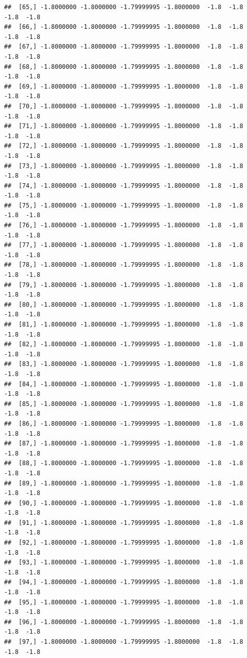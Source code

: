 \documentclass{article}\usepackage[]{graphicx}\usepackage[]{color}
\makeatletter
\newenvironment{kframe}{%
 \def\at@end@of@kframe{}%
 \ifinner\ifhmode%
  \def\at@end@of@kframe{\end{minipage}}%
  \begin{minipage}{\columnwidth}%
 \fi\fi%
 \def\FrameCommand##1{\hskip\@totalleftmargin \hskip-\fboxsep
 \colorbox{shadecolor}{##1}\hskip-\fboxsep
     \hskip-\linewidth \hskip-\@totalleftmargin \hskip\columnwidth}%
 \MakeFramed {\advance\hsize-\width
   \@totalleftmargin\z@ \linewidth\hsize
   \@setminipage}}%
 {\par\unskip\endMakeFramed%
 \at@end@of@kframe}
\newenvironment{knitrout}{}{} %
\makeatother
\begin{document}
\begin{knitrout}
\begin{kframe}
\begin{verbatim}
##  [65,] -1.8000000 -1.8000000 -1.79999995 -1.8000000  -1.8  -1.8  -1.8  -1.8
##  [66,] -1.8000000 -1.8000000 -1.79999995 -1.8000000  -1.8  -1.8  -1.8  -1.8
##  [67,] -1.8000000 -1.8000000 -1.79999995 -1.8000000  -1.8  -1.8  -1.8  -1.8
##  [68,] -1.8000000 -1.8000000 -1.79999995 -1.8000000  -1.8  -1.8  -1.8  -1.8
##  [69,] -1.8000000 -1.8000000 -1.79999995 -1.8000000  -1.8  -1.8  -1.8  -1.8
##  [70,] -1.8000000 -1.8000000 -1.79999995 -1.8000000  -1.8  -1.8  -1.8  -1.8
##  [71,] -1.8000000 -1.8000000 -1.79999995 -1.8000000  -1.8  -1.8  -1.8  -1.8
##  [72,] -1.8000000 -1.8000000 -1.79999995 -1.8000000  -1.8  -1.8  -1.8  -1.8
##  [73,] -1.8000000 -1.8000000 -1.79999995 -1.8000000  -1.8  -1.8  -1.8  -1.8
##  [74,] -1.8000000 -1.8000000 -1.79999995 -1.8000000  -1.8  -1.8  -1.8  -1.8
##  [75,] -1.8000000 -1.8000000 -1.79999995 -1.8000000  -1.8  -1.8  -1.8  -1.8
##  [76,] -1.8000000 -1.8000000 -1.79999995 -1.8000000  -1.8  -1.8  -1.8  -1.8
##  [77,] -1.8000000 -1.8000000 -1.79999995 -1.8000000  -1.8  -1.8  -1.8  -1.8
##  [78,] -1.8000000 -1.8000000 -1.79999995 -1.8000000  -1.8  -1.8  -1.8  -1.8
##  [79,] -1.8000000 -1.8000000 -1.79999995 -1.8000000  -1.8  -1.8  -1.8  -1.8
##  [80,] -1.8000000 -1.8000000 -1.79999995 -1.8000000  -1.8  -1.8  -1.8  -1.8
##  [81,] -1.8000000 -1.8000000 -1.79999995 -1.8000000  -1.8  -1.8  -1.8  -1.8
##  [82,] -1.8000000 -1.8000000 -1.79999995 -1.8000000  -1.8  -1.8  -1.8  -1.8
##  [83,] -1.8000000 -1.8000000 -1.79999995 -1.8000000  -1.8  -1.8  -1.8  -1.8
##  [84,] -1.8000000 -1.8000000 -1.79999995 -1.8000000  -1.8  -1.8  -1.8  -1.8
##  [85,] -1.8000000 -1.8000000 -1.79999995 -1.8000000  -1.8  -1.8  -1.8  -1.8
##  [86,] -1.8000000 -1.8000000 -1.79999995 -1.8000000  -1.8  -1.8  -1.8  -1.8
##  [87,] -1.8000000 -1.8000000 -1.79999995 -1.8000000  -1.8  -1.8  -1.8  -1.8
##  [88,] -1.8000000 -1.8000000 -1.79999995 -1.8000000  -1.8  -1.8  -1.8  -1.8
##  [89,] -1.8000000 -1.8000000 -1.79999995 -1.8000000  -1.8  -1.8  -1.8  -1.8
##  [90,] -1.8000000 -1.8000000 -1.79999995 -1.8000000  -1.8  -1.8  -1.8  -1.8
##  [91,] -1.8000000 -1.8000000 -1.79999995 -1.8000000  -1.8  -1.8  -1.8  -1.8
##  [92,] -1.8000000 -1.8000000 -1.79999995 -1.8000000  -1.8  -1.8  -1.8  -1.8
##  [93,] -1.8000000 -1.8000000 -1.79999995 -1.8000000  -1.8  -1.8  -1.8  -1.8
##  [94,] -1.8000000 -1.8000000 -1.79999995 -1.8000000  -1.8  -1.8  -1.8  -1.8
##  [95,] -1.8000000 -1.8000000 -1.79999995 -1.8000000  -1.8  -1.8  -1.8  -1.8
##  [96,] -1.8000000 -1.8000000 -1.79999995 -1.8000000  -1.8  -1.8  -1.8  -1.8
##  [97,] -1.8000000 -1.8000000 -1.79999995 -1.8000000  -1.8  -1.8  -1.8  -1.8

\end{verbatim}
\end{kframe}
\end{knitrout}
\end{document}
